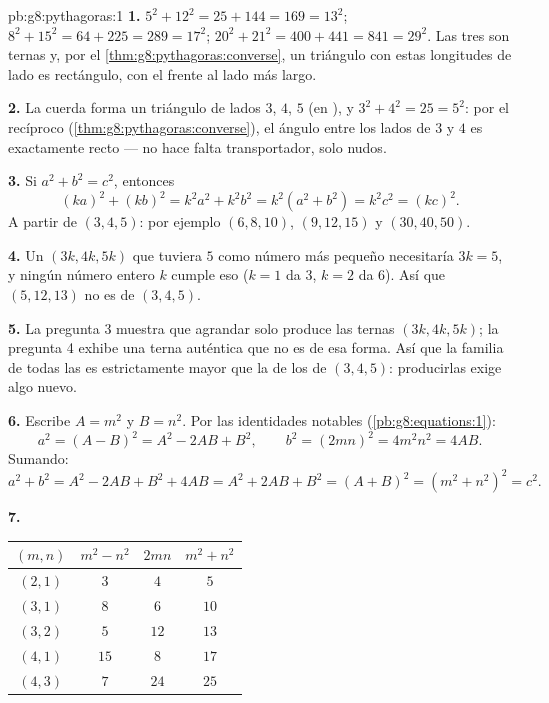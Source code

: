\begin{solution}{pb:g8:pythagoras:1}
\textbf{1.} $5^2 + 12^2 = 25 + 144 = 169 = 13^2$; \quad
$8^2 + 15^2 = 64 + 225 = 289 = 17^2$; \quad
$20^2 + 21^2 = 400 + 441 = 841 = 29^2$. Las tres son ternas
y, por el \cref{thm:g8:pythagoras:converse}, un triángulo con estas
longitudes de lado es rectángulo, con el  frente al lado
más largo.

\textbf{2.} La cuerda forma un triángulo de lados $3$, $4$, $5$
(en ), y $3^2 + 4^2 = 25 = 5^2$: por el recíproco
(\cref{thm:g8:pythagoras:converse}), el ángulo entre los lados
de $3$ y $4$  es exactamente recto --- no hace falta transportador,
solo nudos.

\textbf{3.} Si $a^2 + b^2 = c^2$, entonces
\[
(ka)^2 + (kb)^2 = k^2 a^2 + k^2 b^2
= k^2\left(a^2 + b^2\right) = k^2 c^2 = (kc)^2 .
\]
A partir de $(3, 4, 5)$: por ejemplo $(6, 8, 10)$, $(9, 12, 15)$ y
$(30, 40, 50)$.

\textbf{4.} Un  $(3k, 4k, 5k)$ que tuviera $5$ como número
más pequeño necesitaría $3k = 5$, y ningún número entero $k$
cumple eso ($k = 1$ da $3$, $k = 2$ da $6$). Así que
$(5, 12, 13)$ no es  de $(3, 4, 5)$.

\textbf{5.} La pregunta 3 muestra que agrandar solo produce las ternas
$(3k, 4k, 5k)$; la pregunta 4 exhibe una terna auténtica que no es
de esa forma. Así que la familia de todas las  es
estrictamente mayor que la de los  de $(3, 4, 5)$: producirlas
exige algo nuevo.

\textbf{6.} Escribe $A = m^2$ y $B = n^2$. Por las identidades
notables (\cref{pb:g8:equations:1}):
\[
a^2 = (A - B)^2 = A^2 - 2AB + B^2,
\qquad
b^2 = (2mn)^2 = 4m^2n^2 = 4AB .
\]
Sumando:
\[
a^2 + b^2 = A^2 - 2AB + B^2 + 4AB
= A^2 + 2AB + B^2 = (A + B)^2
= \left(m^2 + n^2\right)^2 = c^2 .
\]

\textbf{7.}
\begin{center}
\renewcommand{\arraystretch}{1.2}
\begin{tabular}{c|ccc}
$(m, n)$ & $m^2 - n^2$ & $2mn$ & $m^2 + n^2$ \\
\hline
$(2, 1)$ & $3$ & $4$ & $5$ \\
$(3, 1)$ & $8$ & $6$ & $10$ \\
$(3, 2)$ & $5$ & $12$ & $13$ \\
$(4, 1)$ & $15$ & $8$ & $17$ \\
$(4, 3)$ & $7$ & $24$ & $25$ \\
\end{tabular}
\end{center}


\end{solution}
